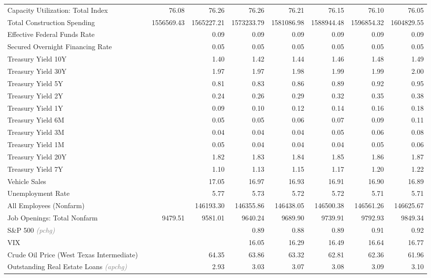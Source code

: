 \documentclass[11pt, letterpaper]{article}\usepackage[]{graphicx}\usepackage[]{color}
\begin{document}
\begin{table}[H]
\begin{tabular}{lrrrrrrrr}
  Capacity Utilization: Total Index &  & 76.08 & 76.26 & 76.26 & 76.21 & 76.15 & 76.10 & 76.05 \\ 
  Total Construction Spending &  & 1556569.43 & 1565227.21 & 1573233.79 & 1581086.98 & 1588944.48 & 1596854.32 & 1604829.55 \\ 
  Effective Federal Funds Rate &  &  & 0.09 & 0.09 & 0.09 & 0.09 & 0.09 & 0.09 \\ 
  Secured Overnight Financing Rate &  &  & 0.05 & 0.05 & 0.05 & 0.05 & 0.05 & 0.05 \\ 
  Treasury Yield 10Y &  &  & 1.40 & 1.42 & 1.44 & 1.46 & 1.48 & 1.49 \\ 
  Treasury Yield 30Y &  &  & 1.97 & 1.97 & 1.98 & 1.99 & 1.99 & 2.00 \\ 
  Treasury Yield 5Y &  &  & 0.81 & 0.83 & 0.86 & 0.89 & 0.92 & 0.95 \\ 
  Treasury Yield 2Y &  &  & 0.24 & 0.26 & 0.29 & 0.32 & 0.35 & 0.38 \\ 
  Treasury Yield 1Y &  &  & 0.09 & 0.10 & 0.12 & 0.14 & 0.16 & 0.18 \\ 
  Treasury Yield 6M &  &  & 0.05 & 0.05 & 0.06 & 0.07 & 0.09 & 0.11 \\ 
  Treasury Yield 3M &  &  & 0.04 & 0.04 & 0.04 & 0.05 & 0.06 & 0.08 \\ 
  Treasury Yield 1M &  &  & 0.05 & 0.04 & 0.04 & 0.04 & 0.05 & 0.06 \\ 
  Treasury Yield 20Y &  &  & 1.82 & 1.83 & 1.84 & 1.85 & 1.86 & 1.87 \\ 
  Treasury Yield 7Y &  &  & 1.10 & 1.13 & 1.15 & 1.17 & 1.20 & 1.22 \\ 
  Vehicle Sales &  &  & 17.05 & 16.97 & 16.93 & 16.91 & 16.90 & 16.89 \\ 
  Unemployment Rate &  &  & 5.77 & 5.73 & 5.72 & 5.72 & 5.71 & 5.71 \\ 
  All Employees (Nonfarm) &  &  & 146193.30 & 146355.86 & 146438.05 & 146500.38 & 146561.26 & 146625.67 \\ 
  Job Openings: Total Nonfarm &  & 9479.51 & 9581.01 & 9640.24 & 9689.90 & 9739.91 & 9792.93 & 9849.34 \\ 
  S\&P 500 \textit{\footnotesize\textcolor{gray}{(pchg)}} &  &  &  & 0.89 & 0.88 & 0.89 & 0.91 & 0.92 \\ 
  VIX &  &  &  & 16.05 & 16.29 & 16.49 & 16.64 & 16.77 \\ 
  Crude Oil Price (West Texas Intermediate) &  &  & 64.35 & 63.86 & 63.32 & 62.81 & 62.36 & 61.96 \\ 
  Outstanding Real Estate Loans \textit{\footnotesize\textcolor{gray}{(apchg)}} &  &  & 2.93 & 3.03 & 3.07 & 3.08 & 3.09 & 3.10 \\ 

\end{tabular}
\end{table}
\end{document}
